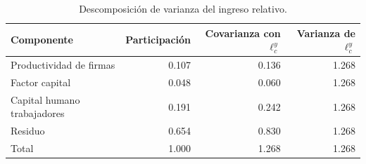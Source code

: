 \begin{table}[H]
    \centering
    \begin{tabular}{lrrr}
        \toprule
        Componente & Participación & Covarianza con $\ell^y_c$ & Varianza de $\ell^y_c$ \\
        \midrule
        Productividad de firmas & 0.107 & 0.136 & 1.268 \\
        Factor capital & 0.048 & 0.060 & 1.268 \\
        Capital humano trabajadores & 0.191 & 0.242 & 1.268 \\
        Residuo & 0.654 & 0.830 & 1.268 \\
        Total & 1.000 & 1.268 & 1.268 \\
        \bottomrule
    \end{tabular}
    \caption{Descomposición de varianza del ingreso relativo.}
    \label{tab:p6_p4_var_decomp}
\end{table}
